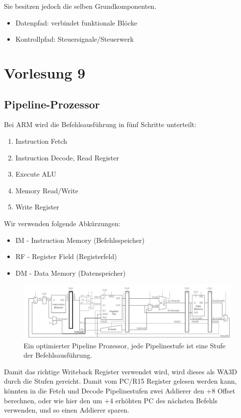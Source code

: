 \documentclass[a4paper,12pt,leqno]{article}
\begin{document}
Sie besitzen jedoch die selben Grundkomponenten.
\begin{itemize}
\item Datenpfad: verbindet funktionale Blöcke
\item Kontrollpfad: Steuersignale/Steuerwerk
\end{itemize}

\newpage

\section{Vorlesung 9}

\subsection{Pipeline-Prozessor}

Bei ARM wird die Befehlsausführung in fünf Schritte unterteilt:
\begin{enumerate}
\item Instruction Fetch
\item Instruction Decode, Read Register
\item Execute ALU
\item Memory Read/Write
\item Write Register
\end{enumerate}

Wir verwenden folgende Abkürzungen:
\begin{itemize}
\item IM - Instruction Memory (Befehlsspeicher)
\item RF - Register Field (Registerfeld)
\item DM - Data Memory (Datenspeicher)
\end{itemize}


\begin{figure}[h!]
\centering
\includegraphics[scale=0.6]{Grafiken/PipelineProzessor-optimiert.png}
\caption{Ein optimierter Pipeline Prozessor, jede Pipelinestufe ist eine Stufe der Befehlsausführung.}
\end{figure}
Damit das richtige Writeback Register verwendet wird, wird dieses als WA3D durch die Stufen gereicht. Damit vom PC/R15 Register gelesen werden kann, könnten in die Fetch und Decode Pipelinestufen zwei Addierer den +8 Offset berechnen, oder wie hier den um +4 erhöhten PC des nächsten Befehls verwenden, und so einen Addierer sparen.
\end{document}
